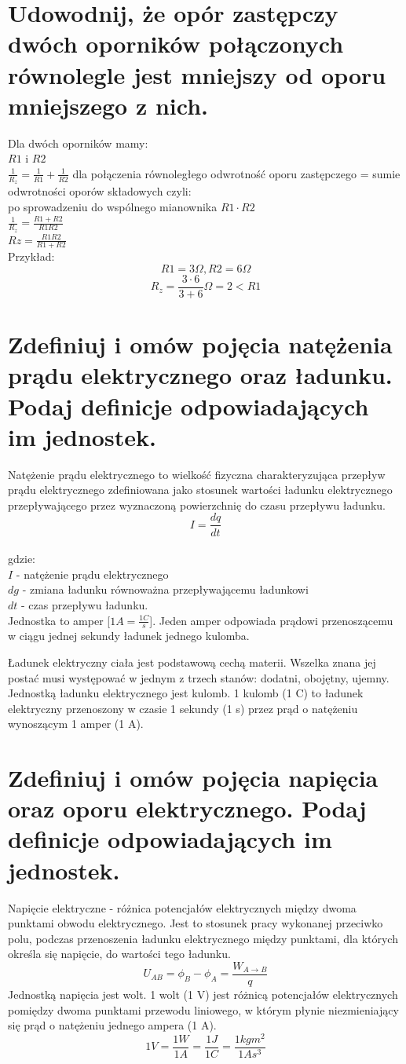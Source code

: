 \documentclass[a4paper,11pt]{article} %
\begin{document}
\section{Udowodnij, że opór zastępczy dwóch oporników połączonych równolegle
jest mniejszy od oporu mniejszego z nich.}

Dla dwóch oporników mamy:\\
$R1$ i $R2$\\
$\frac{1}{R_z} = \frac{1}{R1} + \frac{1}{R2}$ dla połączenia równoległego odwrotność oporu zastępczego = sumie odwrotności oporów składowych czyli:\\ po sprowadzeniu do wspólnego mianownika $R1 \cdot R2$ \\
$\frac{1}{R_z}= \frac{R1 + R2}{R1R2}$\\
$Rz = \frac{R1R2}{R1 + R2}$\\
Przykład: 
$$R1 = 3 \Omega , R2 = 6 \Omega$$
$$R_z = \frac{3\cdot6}{3+6} \Omega = 2 < R1$$

\section{Zdefiniuj i omów pojęcia natężenia prądu elektrycznego oraz ładunku. Podaj
definicje odpowiadających im jednostek.}
Natężenie prądu elektrycznego to wielkość fizyczna charakteryzująca przepływ prądu elektrycznego zdefiniowana jako stosunek wartości ładunku elektrycznego przepływającego przez wyznaczoną powierzchnię do czasu przepływu ładunku.
$$ I = \frac{dq}{dt}$$\\
gdzie:\\
$I$ - natężenie prądu elektrycznego\\
$dg$ - zmiana ładunku równoważna przepływającemu ładunkowi\\
$dt$ - czas przepływu ładunku.\\
Jednostka to amper [$1A = \frac{1C}{s}$]. Jeden amper odpowiada prądowi przenoszącemu w ciągu jednej sekundy ładunek jednego kulomba.

Ładunek elektryczny ciała jest podstawową cechą materii. Wszelka znana jej postać musi występować w jednym z trzech stanów: dodatni, obojętny, ujemny. Jednostką ładunku elektrycznego jest kulomb. 1 kulomb (1 C) to ładunek elektryczny przenoszony w czasie 1 sekundy (1 s) przez prąd o natężeniu wynoszącym 1 amper (1 A).

\section{Zdefiniuj i omów pojęcia napięcia oraz oporu elektrycznego. Podaj definicje
odpowiadających im jednostek.}
Napięcie elektryczne - różnica potencjałów elektrycznych między dwoma punktami obwodu elektrycznego. Jest to stosunek pracy wykonanej przeciwko polu, podczas przenoszenia ładunku elektrycznego między punktami, dla których określa się napięcie, do wartości tego ładunku.
$$ U_{AB} = \phi_B - \phi_A = \frac{W_{A\rightarrow B}}{q}$$
Jednostką napięcia jest wolt. 1 wolt (1 V) jest różnicą potencjałów elektrycznych pomiędzy dwoma punktami przewodu liniowego, w którym płynie niezmieniający się prąd o natężeniu jednego ampera (1 A). 
$$1V = \frac{1W}{1A} = \frac{1J}{1C} = \frac{1kgm^2}{1As^3}$$
\end{document}
